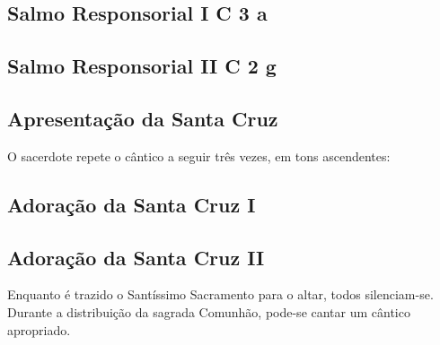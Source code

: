 
\subsection[Salmo Responsorial I]{Salmo Responsorial I \textmd{C 3 a}}\label{subsection:hebdomada-sancta/feria-6-in-passione-domini/psalmus-responsorius-1}

\subsection[Salmo Responsorial II]{Salmo Responsorial II \textmd{C 2 g}}\label{subsection:hebdomada-sancta/feria-6-in-passione-domini/psalmus-responsorius-1}

\AllowPageFlush

\subsection{Apresentação da Santa Cruz}\label{subsection:hebdomada-sancta/feria-6-in-passione-domini/ad-detegendam-sanctam-crucem}
\begin{rubrica}
  O sacerdote repete o cântico a seguir três vezes, em tons ascendentes:
\end{rubrica}

\subsection{Adoração da Santa Cruz I}\label{subsection:hebdomada-sancta/feria-6-in-passione-domini/ad-adoratione-sanctam-crucem-1}

\subsection{Adoração da Santa Cruz II}\label{subsection:hebdomada-sancta/feria-6-in-passione-domini/ad-adoratione-sanctam-crucem-2}

\begin{rubrica}
  Enquanto é trazido o Santíssimo Sacramento para o altar, todos silenciam-se. Durante a distribuição da sagrada Comunhão, pode-se cantar um cântico apropriado.
\end{rubrica}